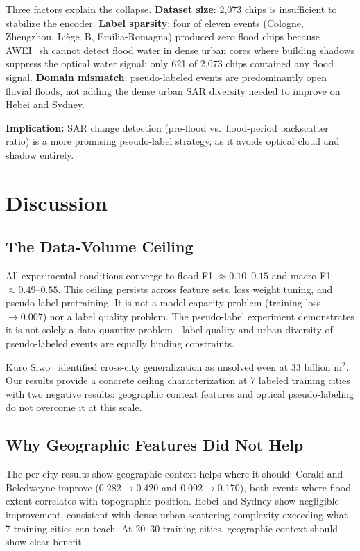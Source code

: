 \documentclass[10pt,twocolumn]{article}
\begin{document}
Three factors explain the collapse.  \textbf{Dataset size}: 2,073
chips is insufficient to stabilize the encoder.  \textbf{Label
sparsity}: four of eleven events (Cologne, Zhengzhou, Liège~B,
Emilia-Romagna) produced zero flood chips because AWEI\_sh cannot
detect flood water in dense urban cores where building shadows suppress
the optical water signal; only 621 of 2,073 chips contained any flood
signal.  \textbf{Domain mismatch}: pseudo-labeled events are
predominantly open fluvial floods, not adding the dense urban SAR
diversity needed to improve on Hebei and Sydney.

\textbf{Implication:} SAR change detection (pre-flood vs.\ flood-period
backscatter ratio) is a more promising pseudo-label strategy, as it
avoids optical cloud and shadow entirely.

\section{Discussion}

\subsection{The Data-Volume Ceiling}

All experimental conditions converge to flood F1 $\approx 0.10$--$0.15$
and macro F1 $\approx 0.49$--$0.55$.  This ceiling persists across
feature sets, loss weight tuning, and pseudo-label pretraining.  It
is not a model capacity problem (training loss $\to 0.007$) nor a label
quality problem.  The pseudo-label experiment demonstrates it is not
solely a data quantity problem---label quality and urban diversity of
pseudo-labeled events are equally binding constraints.

Kuro Siwo~\cite{yadav2024} identified cross-city generalization as
unsolved even at 33 billion m$^2$.  Our results provide a concrete
ceiling characterization at 7 labeled training cities with two
negative results: geographic context features and optical
pseudo-labeling do not overcome it at this scale.

\subsection{Why Geographic Features Did Not Help}

The per-city results show geographic context helps where it should:
Coraki and Beledweyne improve (0.282$\to$0.420 and 0.092$\to$0.170),
both events where flood extent correlates with topographic position.
Hebei and Sydney show negligible improvement, consistent with dense
urban scattering complexity exceeding what 7 training cities can teach.
At 20--30 training cities, geographic context should show clear benefit.
\end{document}
